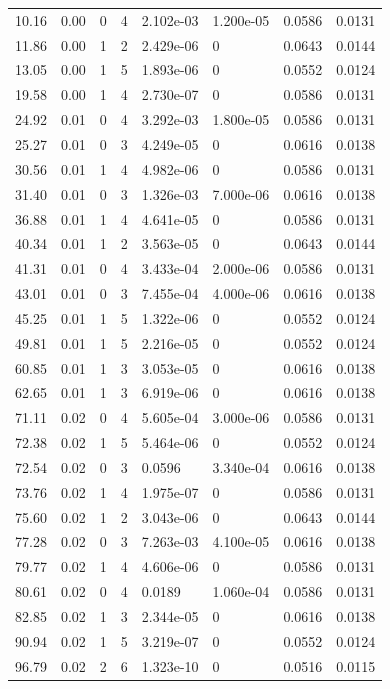 \documentclass[preview]{standalone}
\begin{document}
{{\begin{tabular}{L{1.2cm}C{1.2cm} C{0.3cm}C{0.5cm} C{1.4cm}C{1.4cm} C{1.4cm}C{1.4cm}}
  10.16  &  0.00  & 0     &  4 &  2.102e-03  & 1.200e-05  & 0.0586 &  0.0131   \\ 
  11.86  &  0.00  & 1     &  2 &  2.429e-06  & 0  & 0.0643 &  0.0144   \\ 
  13.05  &  0.00  & 1     &  5 &  1.893e-06  & 0  & 0.0552 &  0.0124   \\ 
  19.58  &  0.00  & 1     &  4 &  2.730e-07  & 0  & 0.0586 &  0.0131   \\ 
  24.92  &  0.01  & 0     &  4 &  3.292e-03  & 1.800e-05  & 0.0586 &  0.0131   \\ 
  25.27  &  0.01  & 0     &  3 &  4.249e-05  & 0  & 0.0616 &  0.0138   \\ 
  30.56  &  0.01  & 1     &  4 &  4.982e-06  & 0  & 0.0586 &  0.0131   \\ 
  31.40  &  0.01  & 0     &  3 &  1.326e-03  & 7.000e-06  & 0.0616 &  0.0138   \\ 
  36.88  &  0.01  & 1     &  4 &  4.641e-05  & 0  & 0.0586 &  0.0131   \\ 
  40.34  &  0.01  & 1     &  2 &  3.563e-05  & 0  & 0.0643 &  0.0144   \\ 
  41.31  &  0.01  & 0     &  4 &  3.433e-04  & 2.000e-06  & 0.0586 &  0.0131   \\ 
  43.01  &  0.01  & 0     &  3 &  7.455e-04  & 4.000e-06  & 0.0616 &  0.0138   \\ 
  45.25  &  0.01  & 1     &  5 &  1.322e-06  & 0  & 0.0552 &  0.0124   \\ 
  49.81  &  0.01  & 1     &  5 &  2.216e-05  & 0  & 0.0552 &  0.0124   \\ 
  60.85  &  0.01  & 1     &  3 &  3.053e-05  & 0  & 0.0616 &  0.0138   \\ 
  62.65  &  0.01  & 1     &  3 &  6.919e-06  & 0  & 0.0616 &  0.0138   \\ 
  71.11  &  0.02  & 0     &  4 &  5.605e-04  & 3.000e-06  & 0.0586 &  0.0131   \\ 
  72.38  &  0.02  & 1     &  5 &  5.464e-06  & 0  & 0.0552 &  0.0124   \\ 
  72.54  &  0.02  & 0     &  3 &  0.0596  & 3.340e-04  & 0.0616 &  0.0138   \\ 
  73.76  &  0.02  & 1     &  4 &  1.975e-07  & 0  & 0.0586 &  0.0131   \\ 
  75.60  &  0.02  & 1     &  2 &  3.043e-06  & 0  & 0.0643 &  0.0144   \\ 
  77.28  &  0.02  & 0     &  3 &  7.263e-03  & 4.100e-05  & 0.0616 &  0.0138   \\ 
  79.77  &  0.02  & 1     &  4 &  4.606e-06  & 0  & 0.0586 &  0.0131   \\ 
  80.61  &  0.02  & 0     &  4 &  0.0189  & 1.060e-04  & 0.0586 &  0.0131   \\ 
  82.85  &  0.02  & 1     &  3 &  2.344e-05  & 0  & 0.0616 &  0.0138   \\ 
  90.94  &  0.02  & 1     &  5 &  3.219e-07  & 0  & 0.0552 &  0.0124   \\ 
  96.79  &  0.02  & 2     &  6 &  1.323e-10  & 0  & 0.0516 &  0.0115   \\ 
\hline 
\end{tabular} 

}}
\end{document}

